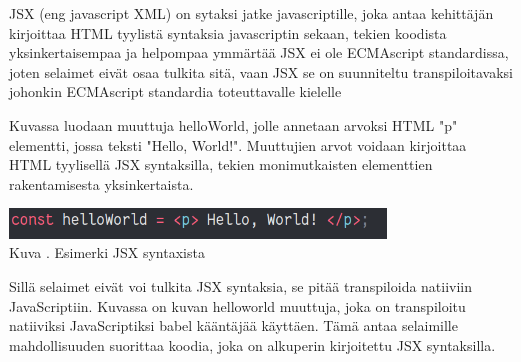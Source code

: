 







JSX (eng javascript XML) on sytaksi jatke javascriptille, joka antaa kehittäjän kirjoittaa HTML tyylistä syntaksia javascriptin sekaan,
tekien koodista yksinkertaisempaa ja helpompaa ymmärtää
JSX ei ole ECMAscript standardissa, joten selaimet eivät osaa tulkita sitä,
vaan JSX se on suunniteltu transpiloitavaksi johonkin ECMAscript standardia toteuttavalle kielelle
\medskip






Kuvassa \nextImageCount{} luodaan muuttuja helloWorld, jolle annetaan arvoksi HTML "p"{} elementti, jossa teksti "Hello, World!"{}.
Muuttujien arvot voidaan kirjoittaa HTML tyylisellä JSX syntaksilla, tekien monimutkaisten elementtien rakentamisesta yksinkertaista.
\medskip



\bigskip
\includegraphics[width=10cm]{src/public/oppar/pure_jsx_example.png}\\
Kuva \getImgCount {}. Esimerki JSX syntaxista
\medskip




Sillä selaimet eivät voi tulkita JSX syntaksia, se pitää transpiloida natiiviin JavaScriptiin.
Kuvassa \nextImageCount{} on kuvan \theimgCounter{} helloworld muuttuja, joka on transpiloitu natiiviksi JavaScriptiksi babel kääntäjää käyttäen. 
Tämä antaa selaimille mahdollisuuden suorittaa koodia, joka on alkuperin kirjoitettu JSX syntaksilla.
\medskip


